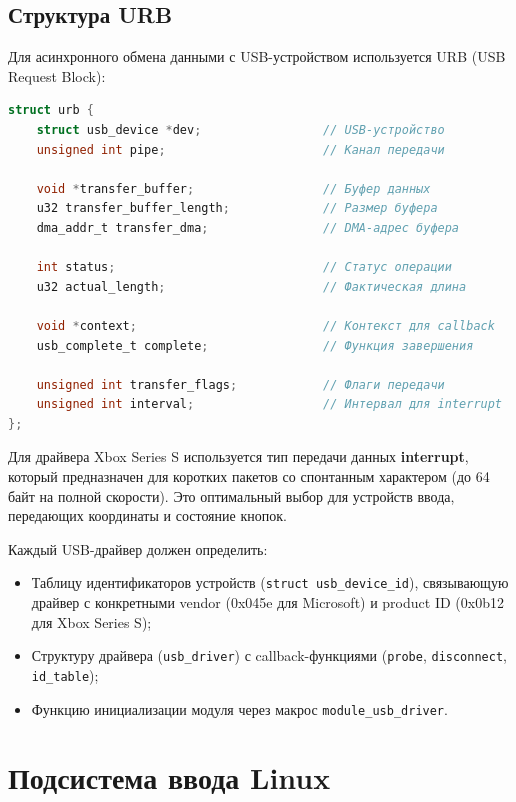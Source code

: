 \subsection{Структура URB}

Для асинхронного обмена данными с USB-устройством используется URB (USB Request Block):

\begin{lstlisting}[label=lst:urb,caption=Структура urb,language=c]
struct urb {
    struct usb_device *dev;                 // USB-устройство
    unsigned int pipe;                      // Канал передачи
    
    void *transfer_buffer;                  // Буфер данных
    u32 transfer_buffer_length;             // Размер буфера
    dma_addr_t transfer_dma;                // DMA-адрес буфера
    
    int status;                             // Статус операции
    u32 actual_length;                      // Фактическая длина
    
    void *context;                          // Контекст для callback
    usb_complete_t complete;                // Функция завершения
    
    unsigned int transfer_flags;            // Флаги передачи
    unsigned int interval;                  // Интервал для interrupt
};
\end{lstlisting}

Для драйвера Xbox Series S используется тип передачи данных \textbf{interrupt}, который предназначен для коротких пакетов со спонтанным характером (до 64 байт на полной скорости). Это оптимальный выбор для устройств ввода, передающих координаты и состояние кнопок.

Каждый USB-драйвер должен определить:
\begin{itemize}[label=---]
    \item Таблицу идентификаторов устройств (\texttt{struct usb\_device\_id}), связывающую драйвер с конкретными vendor (0x045e для Microsoft) и product ID (0x0b12 для Xbox Series S);
    \item Структуру драйвера (\texttt{usb\_driver}) с callback-функциями (\texttt{probe}, \texttt{disconnect}, \texttt{id\_table});
    \item Функцию инициализации модуля через макрос \texttt{module\_usb\_driver}.
\end{itemize}

\section{Подсистема ввода Linux}

